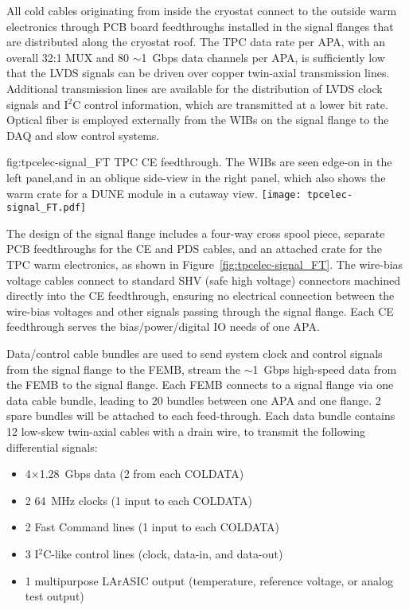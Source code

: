 All cold cables originating from inside the cryostat connect to the outside warm electronics through PCB board feedthroughs
installed in the signal flanges that are distributed along the cryostat roof.
The TPC data rate per APA, with an overall 32:1 MUX and 80 $\sim$1~Gbps data channels per APA,
is sufficiently low that the LVDS signals can be driven over copper twin-axial transmission lines.
Additional transmission lines are available for the distribution of LVDS clock signals and I$^2$C control information,
which are transmitted at a lower bit rate.
Optical fiber is employed externally from the WIBs on the signal flange to the DAQ and slow control systems.

\begin{dunefigure}
{fig:tpcelec-signal_FT}
{TPC CE feedthrough. The WIBs are seen edge-on in the left panel,and in an oblique side-view in the right panel, which also shows the warm crate for a DUNE module in a cutaway view.}
\texttt{[image: tpcelec-signal\_FT.pdf]}
\end{dunefigure}

The design of the signal flange includes a four-way cross spool piece, separate PCB feedthroughs for the CE and PDS cables, and
an attached crate for the TPC warm electronics, as shown in Figure~\ref{fig:tpcelec-signal_FT}.
The wire-bias voltage cables connect to standard SHV (safe high voltage) connectors machined directly into the CE feedthrough,
ensuring no electrical connection between the wire-bias voltages and other signals passing through the signal flange.
Each CE feedthrough serves the bias/power/digital IO needs of one APA.  

Data/control cable bundles are used to send system clock and control signals from the 
signal flange to the FEMB, stream the $\sim$1~Gbps high-speed data from the FEMB to the signal flange.  Each FEMB 
connects to a signal flange via one data cable bundle, leading to 20 bundles between one APA and one flange.
2 spare bundles will be attached to each feed-through. Each data bundle contains 12 low-skew twin-axial cables with a drain wire, 
to transmit the following differential signals:

\begin{itemize}
    \item 4$\times$1.28~Gbps data (2 from each COLDATA)
    \item 2 64~MHz clocks (1 input to each COLDATA)
    \item 2 Fast Command lines (1 input to each COLDATA)
    \item 3 I$^2$C-like control lines (clock, data-in, and data-out)
    \item 1 multipurpose LArASIC output (temperature, reference voltage, or analog test output)
\end{itemize}

